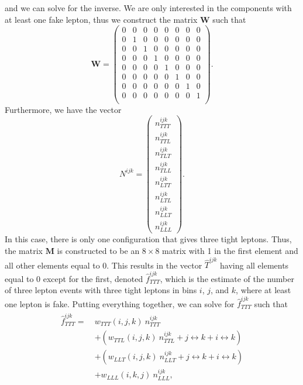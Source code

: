 and we can solve for the inverse.  
We are only interested in the components with at least one
fake lepton, thus we construct the matrix $\mathbf{W}$ such that
\begin{equation}
\mathbf{W} = 
\begin{pmatrix}
0 & 0 & 0 & 0 & 0 & 0 & 0 & 0 \\
0 & 1 & 0 & 0 & 0 & 0 & 0 & 0 \\
0 & 0 & 1 & 0 & 0 & 0 & 0 & 0 \\
0 & 0 & 0 & 1 & 0 & 0 & 0 & 0 \\
0 & 0 & 0 & 0 & 1 & 0 & 0 & 0 \\
0 & 0 & 0 & 0 & 0 & 1 & 0 & 0 \\
0 & 0 & 0 & 0 & 0 & 0 & 1 & 0 \\
0 & 0 & 0 & 0 & 0 & 0 & 0 & 1 \\
\end{pmatrix}.
\end{equation}
Furthermore, we have the vector 
\begin{equation}
N^{ijk}=\begin{pmatrix} 
  n_{TTT}^{ijk}\\
  n_{TTL}^{ijk}\\
  n_{TLT}^{ijk}\\
  n_{TLL}^{ijk}\\
  n_{LTT}^{ijk}\\
  n_{LTL}^{ijk}\\
  n_{LLT}^{ijk}\\
  n_{LLL}^{ijk}
  \end{pmatrix}.
\end{equation}
In this case, there is only one configuration that gives 
three tight leptons.  Thus, the matrix $\mathbf{M}$ is constructed
to be an $8 \times 8$ matrix with 1 in the first element and 
all other elements equal to 0. This results in the vector
$\hat{T}^{ijk}$ having all elements equal to 0 except for the first,
denoted $\hat{f}_{TTT}^{ijk}$, which is the
estimate of the number of three lepton events with three tight leptons 
in bins $i$, $j$, and $k$,
where at least one lepton is fake.
Putting everything together, we can solve for 
$\hat{f}_{TTT}^{ijk}$ such that
\begin{align}
\begin{split}
\label{eq:mxm_threeleptons}
\hat{f}^{ijk}_{TTT} = ~& w_{TTT}(i,j,k)~n^{ijk}_{TTT}  \\
   &+(w_{TTL}(i,j,k)~n^{ijk}_{TTL} + j\leftrightarrow k + i \leftrightarrow k)\\
   &+(w_{LLT}(i,j,k)~n^{ijk}_{LLT} + j\leftrightarrow k + i \leftrightarrow k) \\
   &+w_{LLL}(i,k,j)~n^{ijk}_{LLL} ,
\end{split}
\end{align}
